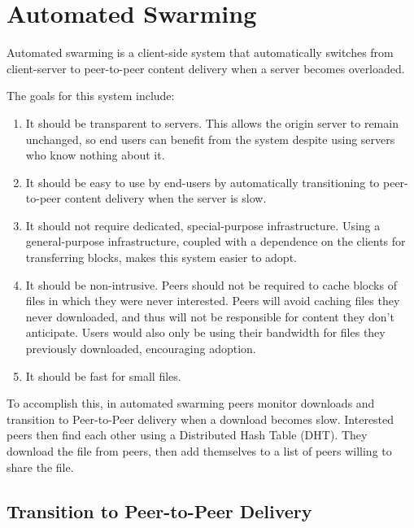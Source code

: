 \chapter {Automated Swarming}\label{section:solution}

Automated swarming is a client-side system that automatically switches from client-server to peer-to-peer content delivery when a server becomes overloaded.  

The goals for this system include:
\begin{enumerate}
\item It should be transparent to servers.  This allows the origin server to remain unchanged, so end users can benefit from the system despite using servers who know nothing about it.
\item It should be easy to use by end-users by automatically transitioning to peer-to-peer content delivery when the server is slow.
\item It should not require dedicated, special-purpose infrastructure.  Using a general-purpose infrastructure, coupled with a dependence on the clients for transferring blocks,
makes this system easier to adopt.
\item It should be non-intrusive.  Peers should not be required to cache blocks of files in which they were never interested.  
Peers will avoid caching files they never downloaded, and thus will not be responsible for content they don't anticipate.  
Users would also only be using their bandwidth for files they previously downloaded, encouraging adoption.
\item It should be fast for small files.
\end{enumerate}

To accomplish this, in automated swarming peers monitor downloads and transition to Peer-to-Peer delivery 
when a download becomes slow.  Interested peers then find each other using a Distributed Hash Table (DHT).
They download the file from peers, then add themselves to a list of peers willing to share the file.

\section{Transition to Peer-to-Peer Delivery}


